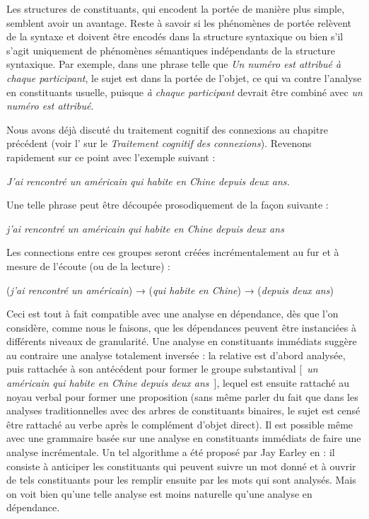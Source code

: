 {    Les structures de constituants, qui encodent la portée de manière plus simple, semblent avoir un avantage. Reste à savoir si les phénomènes de portée relèvent de la syntaxe et doivent être encodés dans la structure syntaxique ou bien s’il s’agit uniquement de phénomènes sémantiques indépendants de la structure syntaxique. Par exemple, dans une phrase telle que \textit{Un numéro est attribué à chaque participant}, le sujet est dans la portée de l’objet, ce qui va contre l’analyse en constituants usuelle, puisque \textit{à chaque participant} devrait être combiné avec \textit{un numéro est attribué}.

    Nous avons déjà discuté du traitement cognitif des connexions au chapitre précédent (voir l' sur le \textit{Traitement cognitif des connexions}). Revenons rapidement sur ce point avec l’exemple suivant :

    \ea
    \textit{{J’ai rencontré un américain qui habite en Chine depuis deux ans.}}
    \z

    Une telle phrase peut être découpée prosodiquement de la façon suivante :

    \ea
    \textit{{j’ai rencontré un américain}} {\textbar} \textit{qui habite en Chine} {\textbar} \textit{depuis deux ans}
    \z

    Les connections entre ces groupes seront créées incrémentalement au fur et à mesure de l’écoute (ou de la lecture) :
    
    \ea
    (\textit{j’ai rencontré un américain}) \textrm{→} (\textit{qui habite en Chine}) \textrm{→} (\textit{depuis deux ans})
    \z

    Ceci est tout à fait compatible avec une analyse en dépendance, dès que l'on considère, comme nous le faisons, que les dépendances peuvent être instanciées à différents niveaux de granularité. Une analyse en constituants immédiats suggère au contraire une analyse totalement inversée : la relative est d’abord analysée, puis rattachée à son antécédent pour former le groupe substantival [~\textit{un américain qui habite en Chine depuis deux ans}~], lequel est ensuite rattaché au noyau verbal pour former une proposition (sans même parler du fait que dans les analyses traditionnelles avec des arbres de constituants binaires, le sujet est censé être rattaché au verbe après le complément d’objet direct).
    Il est possible même avec une grammaire basée sur une analyse en constituants immédiats de faire une analyse incrémentale. Un tel algorithme a été proposé par Jay Earley en \citeyear{earley1970efficient} : il consiste à anticiper les constituants qui peuvent suivre un mot donné et à ouvrir de tels constituants pour les remplir ensuite par les mots qui sont analysés. Mais on voit bien qu’une telle analyse est moins naturelle qu’une analyse en dépendance.
}
